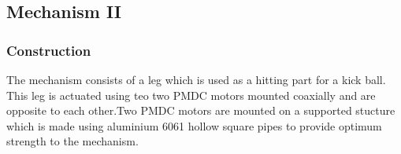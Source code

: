     \subsection{Mechanism II}
    
        \subsubsection{Construction}
            The mechanism consists of a leg which is used as a hitting part for a kick ball. This leg is actuated using teo two PMDC motors 
            mounted coaxially and are opposite to each other.Two PMDC motors are mounted on a supported stucture which is made using 
            aluminium 6061 hollow square pipes to provide optimum strength to the mechanism.

